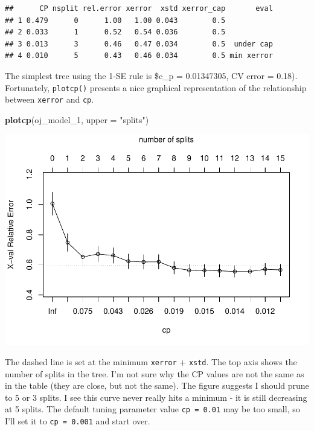 \documentclass[
]{book}
\newenvironment{Shaded}{\begin{snugshade}}{\end{snugshade}}
\newcommand{\DataTypeTok}[1]{\textcolor[rgb]{0.13,0.29,0.53}{#1}}
\newcommand{\DecValTok}[1]{\textcolor[rgb]{0.00,0.00,0.81}{#1}}
\newcommand{\KeywordTok}[1]{\textcolor[rgb]{0.13,0.29,0.53}{\textbf{#1}}}
\newcommand{\NormalTok}[1]{#1}
\newcommand{\StringTok}[1]{\textcolor[rgb]{0.31,0.60,0.02}{#1}}
\begin{document}
\begin{verbatim}
##      CP nsplit rel.error xerror  xstd xerror_cap       eval
## 1 0.479      0      1.00   1.00 0.043        0.5           
## 2 0.033      1      0.52   0.54 0.036        0.5           
## 3 0.013      3      0.46   0.47 0.034        0.5  under cap
## 4 0.010      5      0.43   0.46 0.034        0.5 min xerror
\end{verbatim}

The simplest tree using the 1-SE rule is \$c\_p = 0.01347305, CV error = 0.18). Fortunately, \texttt{plotcp()} presents a nice graphical representation of the relationship between \texttt{xerror} and \texttt{cp}.

\begin{Shaded}
\begin{Highlighting}[]
\KeywordTok{plotcp}\NormalTok{(oj_model_}\DecValTok{1}\NormalTok{, }\DataTypeTok{upper =} \StringTok{"splits"}\NormalTok{)}
\end{Highlighting}
\end{Shaded}

\includegraphics{data-sci_files/figure-latex/unnamed-chunk-64-1.pdf}

The dashed line is set at the minimum \texttt{xerror} + \texttt{xstd}. The top axis shows the number of splits in the tree. I'm not sure why the CP values are not the same as in the table (they are close, but not the same). The figure suggests I should prune to 5 or 3 splits. I see this curve never really hits a minimum - it is still decreasing at 5 splits. The default tuning parameter value \texttt{cp\ =\ 0.01} may be too small, so I'll set it to \texttt{cp\ =\ 0.001} and start over.
\end{document}

